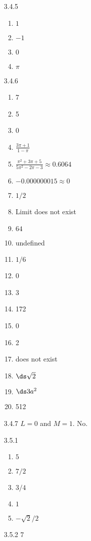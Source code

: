 \begin{Answer}{3.4.5}
\begin{enumerate}
\item {$1$}
\item {$-1$}
\item {$0$}
\item {$\pi$}
\end{enumerate}
\end{Answer}
\begin{Answer}{3.4.6}
\begin{multicols}{2}
\begin{enumerate}
	\item	7
	\item	5
	\item	0
	\item {$\frac{3\pi+1}{1-\pi}$}
	\item {$\frac{\pi^2+3\pi+5}{5\pi^2-2\pi-3} \approx 0.6064$}
	\item 	{$-0.000000015\approx 0$}
	\item {$1/2$}
	\item 	{Limit does not exist}
	\item 	{$64$}
	\item	undefined
	\item	$1/6$
	\item	0
	\item	3
	\item	172
	\item	0
	\item	2
	\item	does not exist
	\item	$\ds \sqrt2$
	\item	$\ds 3a^2$
	\item	512
\end{enumerate}
\end{multicols}
\end{Answer}
\begin{Answer}{3.4.7}
	$L=0$ and $M=1.$ No.
\end{Answer}
\begin{Answer}{3.5.1}
\begin{enumerate}
	\item	$5$
	\item	$7/2$
	\item	$3/4$
	\item	$1$
	\item	$-\sqrt2/2$
\end{enumerate}
\end{Answer}
\begin{Answer}{3.5.2}
 $7$
\end{Answer}
